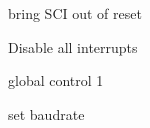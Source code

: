 \begin{DoxyItemize}
\item bring S\+CI out of reset ~\newline
~\newline
~\newline
~\newline
~\newline
~\newline
~\newline
~\newline
~\newline
~\newline
~\newline
~\newline
~\newline
~\newline

\item Disable all interrupts ~\newline
~\newline
~\newline
~\newline
~\newline
~\newline
~\newline
~\newline
~\newline
~\newline
~\newline
~\newline
~\newline

\item global control 1 ~\newline
~\newline
~\newline
~\newline
~\newline
~\newline
~\newline
~\newline
~\newline
~\newline
~\newline
~\newline

\item set baudrate ~\newline
~\newline
~\newline
~\newline
~\newline
~\newline
~\newline
~\newline
~\newline
~\newline
~\newline


\end{DoxyItemize}
